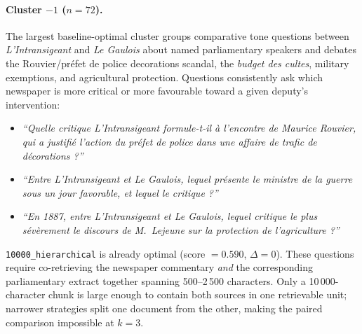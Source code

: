 \paragraph{Cluster $-1$ ($n=72$).}
The largest baseline-optimal cluster groups comparative tone questions between
\emph{L'Intransigeant} and \emph{Le Gaulois} about named parliamentary speakers
and debates the Rouvier/pr\'{e}fet de police decorations scandal, the
\emph{budget des cultes}, military exemptions, and agricultural protection.
Questions consistently ask which newspaper is more critical or more favourable
toward a given deputy's intervention:
\begin{itemize}
  \item \textit{``Quelle critique L'Intransigeant formule-t-il \`{a} l'encontre de
    Maurice Rouvier, qui a justifi\'{e} l'action du pr\'{e}fet de police dans une
    affaire de trafic de d\'{e}corations ?''}
  \item \textit{``Entre L'Intransigeant et Le Gaulois, lequel pr\'{e}sente le
    ministre de la guerre sous un jour favorable, et lequel le critique ?''}
  \item \textit{``En 1887, entre L'Intransigeant et Le Gaulois, lequel critique le
    plus s\'{e}v\`{e}rement le discours de M.~Lejeune sur la protection de
    l'agriculture ?''}
\end{itemize}
\texttt{10000\_hierarchical} is already optimal (score $= 0.590$, $\Delta = 0$).
These questions require co-retrieving the newspaper commentary \emph{and} the
corresponding parliamentary extract together spanning 500--2\,500 characters.
Only a 10\,000-character chunk is large enough to contain both sources in one
retrievable unit; narrower strategies split one document from the other, making
the paired comparison impossible at $k{=}3$.

